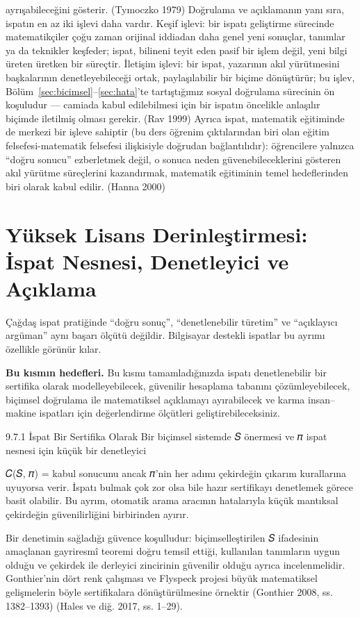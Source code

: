 ayrışabileceğini gösterir. (Tymoczko 1979) Doğrulama ve açıklamanın yanı sıra, ispatın en az iki işlevi daha vardır. Keşif işlevi: bir ispatı geliştirme sürecinde matematikçiler çoğu zaman orijinal iddiadan daha genel yeni sonuçlar, tanımlar ya da teknikler keşfeder; ispat, bilineni teyit eden pasif bir işlem değil, yeni bilgi üreten üretken bir süreçtir. İletişim işlevi: bir ispat, yazarının akıl yürütmesini başkalarının denetleyebileceği ortak, paylaşılabilir bir biçime dönüştürür; bu işlev, Bölüm~\ref{sec:bicimsel}--\ref{sec:hata}’te tartıştığımız sosyal doğrulama sürecinin ön koşuludur — camiada kabul edilebilmesi için bir ispatın öncelikle anlaşılır biçimde iletilmiş olması gerekir. (Rav 1999) Ayrıca ispat, matematik eğitiminde de merkezi bir işleve sahiptir (bu ders öğrenim çıktılarından biri olan eğitim felsefesi-matematik felsefesi ilişkisiyle doğrudan bağlantılıdır): öğrencilere yalnızca “doğru sonucu” ezberletmek değil, o sonuca neden güvenebileceklerini gösteren akıl yürütme süreçlerini kazandırmak, matematik eğitiminin temel hedeflerinden biri olarak kabul edilir. (Hanna 2000)

\section{Yüksek Lisans Derinleştirmesi: İspat Nesnesi, Denetleyici ve Açıklama}

Çağdaş ispat pratiğinde “doğru sonuç”, “denetlenebilir türetim” ve “açıklayıcı argüman” aynı başarı ölçütü değildir. Bilgisayar destekli ispatlar bu ayrımı özellikle görünür kılar.

\textbf{Bu kısmın hedefleri.} Bu kısmı tamamladığınızda ispatı denetlenebilir bir sertifika olarak modelleyebilecek, güvenilir hesaplama tabanını çözümleyebilecek, biçimsel doğrulama ile matematiksel açıklamayı ayırabilecek ve karma insan–makine ispatları için değerlendirme ölçütleri geliştirebileceksiniz.


9.7.1 İspat Bir Sertifika Olarak Bir biçimsel sistemde 𝑆 önermesi ve 𝜋 ispat nesnesi için küçük bir denetleyici

𝐶(𝑆, 𝜋) = kabul sonucunu ancak 𝜋’nin her adımı çekirdeğin çıkarım kurallarına uyuyorsa verir. İspatı bulmak çok zor olsa bile hazır sertifikayı denetlemek görece basit olabilir. Bu ayrım, otomatik arama aracının hatalarıyla küçük mantıksal çekirdeğin güvenilirliğini birbirinden ayırır.

Bir denetimin sağladığı güvence koşulludur: biçimselleştirilen 𝑆 ifadesinin amaçlanan gayriresmî teoremi doğru temsil ettiği, kullanılan tanımların uygun olduğu ve çekirdek ile derleyici zincirinin güvenilir olduğu ayrıca incelenmelidir. Gonthier’nin dört renk çalışması ve Flyspeck projesi büyük matematiksel gelişmelerin böyle sertifikalara dönüştürülmesine örnektir (Gonthier 2008, ss. 1382–1393) (Hales ve diğ. 2017, ss. 1–29).

